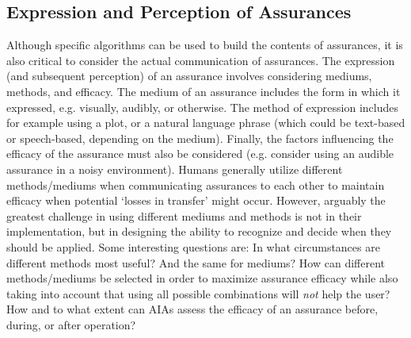 \subsection{Expression and Perception of Assurances} \label{sec:express_assurances}
Although specific algorithms can be used to build the contents of assurances, it is also critical to consider the actual communication of assurances. The expression (and subsequent perception) of an assurance involves considering mediums, methods, and efficacy. The medium of an assurance includes the form in which it expressed, e.g. visually, audibly, or otherwise. 
The method of expression includes for example using a plot, or a natural language phrase (which could be text-based or speech-based, depending on the medium).  Finally, the factors influencing the efficacy of the assurance must also be considered (e.g. consider using an audible assurance in a noisy environment). Humans generally utilize different methods/mediums when communicating assurances to each other to maintain efficacy when potential `losses in transfer' might occur. 
However, arguably the greatest challenge in using different mediums and methods is not in their implementation, but in designing the ability to recognize and decide when they should be applied. Some interesting questions are: In what circumstances are different methods most useful? And the same for mediums? How can different methods/mediums be selected in order to maximize assurance efficacy while also taking into account that using all possible combinations will \emph{not} help the user? How and to what extent can AIAs assess the efficacy of an assurance before, during, or after operation?